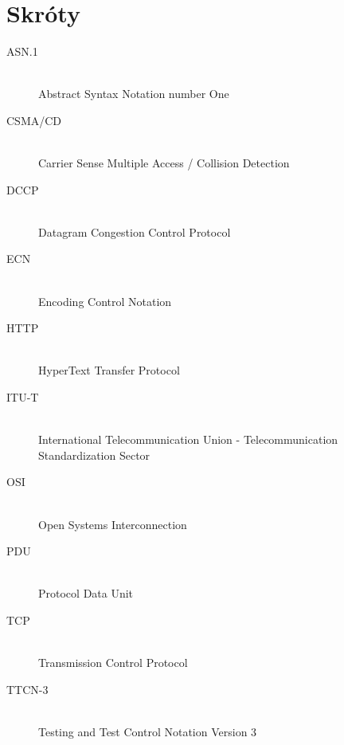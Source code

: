 \documentclass[00-praca-magisterska.tex]{subfiles}
\begin{document}
\appendix
\chapter{Skróty}

\begin{description}
  \item[ASN.1] \hfill \\ Abstract Syntax Notation number One
  \item[CSMA/CD] \hfill \\ Carrier Sense Multiple Access / Collision Detection
  \item[DCCP] \hfill \\ Datagram Congestion Control Protocol
  \item[ECN] \hfill \\ Encoding Control Notation
  \item[HTTP] \hfill \\ HyperText Transfer Protocol
  \item[ITU-T] \hfill \\ International Telecommunication Union - Telecommunication Standardization Sector
  \item[OSI] \hfill \\ Open Systems Interconnection
  \item[PDU] \hfill \\ Protocol Data Unit
  \item[TCP] \hfill \\ Transmission Control Protocol
  \item[TTCN-3] \hfill \\ Testing and Test Control Notation Version 3
\end{description}
\end{document}

